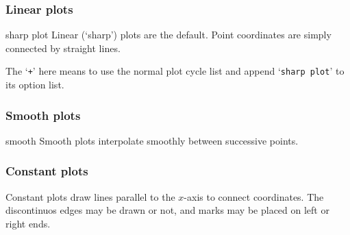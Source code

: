 \subsubsection{Linear plots}
\begin{plottype}{sharp plot}
Linear (`sharp') plots are the default. Point coordinates are simply connected by straight lines. 
\begin{codeexample}[]
\end{codeexample}

The `\texttt{+}' here means to use the normal plot cycle list and append `\texttt{sharp plot}' to its option list.
\end{plottype}

\subsubsection{Smooth plots}
\begin{plottype}{smooth}
Smooth plots interpolate smoothly between successive points.
\begin{codeexample}[]
\end{codeexample}
\end{plottype}

\subsubsection{Constant plots}
Constant plots draw lines parallel to the $x$-axis to connect coordinates. The discontinuos edges may be drawn or not, and marks may be placed on left or right ends.


